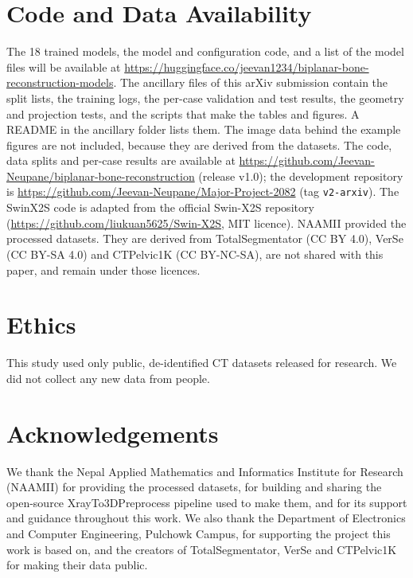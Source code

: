 \documentclass[11pt]{article}
\begin{document}
\section*{Code and Data Availability}
The 18 trained models, the model and configuration code, and a list of the model files will be available at \url{https://huggingface.co/jeevan1234/biplanar-bone-reconstruction-models}. The ancillary files of this arXiv submission contain the split lists, the training logs, the per-case validation and test results, the geometry and projection tests, and the scripts that make the tables and figures. A README in the ancillary folder lists them. The image data behind the example figures are not included, because they are derived from the datasets. The code, data splits and per-case results are available at \url{https://github.com/Jeevan-Neupane/biplanar-bone-reconstruction} (release v1.0); the development repository is \url{https://github.com/Jeevan-Neupane/Major-Project-2082} (tag \texttt{v2-arxiv}). The SwinX2S code is adapted from the official Swin-X2S repository (\url{https://github.com/liukuan5625/Swin-X2S}, MIT licence). NAAMII provided the processed datasets. They are derived from TotalSegmentator (CC BY 4.0), VerSe (CC BY-SA 4.0) and CTPelvic1K (CC BY-NC-SA), are not shared with this paper, and remain under those licences.

\section*{Ethics}
This study used only public, de-identified CT datasets released for research. We did not collect any new data from people.

\section*{Acknowledgements}
We thank the Nepal Applied Mathematics and Informatics Institute for Research (NAAMII) for providing the processed datasets, for building and sharing the open-source XrayTo3DPreprocess pipeline used to make them, and for its support and guidance throughout this work. We also thank the Department of Electronics and Computer Engineering, Pulchowk Campus, for supporting the project this work is based on, and the creators of TotalSegmentator, VerSe and CTPelvic1K for making their data public.

\FloatBarrier



\appendix
\FloatBarrier
\end{document}
